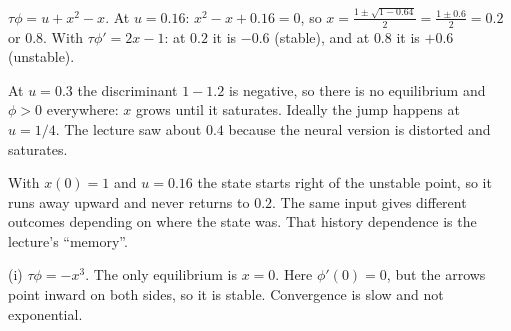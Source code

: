 \documentclass[11pt,letterpaper]{article}
\newcommand{\ans}[1]{\par\vspace{4pt}{\bfseries #1}\quad}
\begin{document}
\ans{Q1}
$\tau\phi = u + x^2 - x$. At $u = 0.16$: $x^2 - x + 0.16 = 0$, so $x = \frac{1 \pm \sqrt{1 - 0.64}}{2} = \frac{1 \pm 0.6}{2} = 0.2$ or $0.8$. With $\tau\phi' = 2x - 1$: at $0.2$ it is $-0.6$ (stable), and at $0.8$ it is $+0.6$ (unstable).

At $u = 0.3$ the discriminant $1 - 1.2$ is negative, so there is no equilibrium and $\phi > 0$ everywhere: $x$ grows until it saturates. Ideally the jump happens at $u = 1/4$. The lecture saw about $0.4$ because the neural version is distorted and saturates.

With $x(0) = 1$ and $u = 0.16$ the state starts right of the unstable point, so it runs away upward and never returns to $0.2$. The same input gives different outcomes depending on where the state was. That history dependence is the lecture's ``memory''.

\ans{Q2}
(i) $\tau\phi = -x^3$. The only equilibrium is $x = 0$. Here $\phi'(0) = 0$, but the arrows point inward on both sides, so it is stable. Convergence is slow and not exponential.
\end{document}
